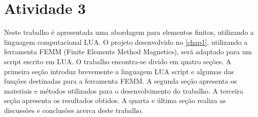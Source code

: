 \chapter{Atividade 3}
\label{chap2}
Neste trabalho é apresentada uma abordagem para elementos finitos, utilizando a linguagem computacional LUA. O projeto desenvolvido no \ref{chap1}, utilizando a ferramenta FEMM (Finite Elements Method Magnetics), será adaptado para um script escrito em LUA. O trabalho encontra-se divido em quatro seções. A primeira seção introduz brevemente a linguagem LUA script e algumas das funções destinadas para a ferramenta FEMM. A segunda seção apresenta os materiais e métodos utilizados para o desenvolvimento do trabalho. A terceira seção apresenta os resultados obtidos. A quarta e última seção realiza as discussões e conclusões acerca deste trabalho.
\newpage
\pagebreak




